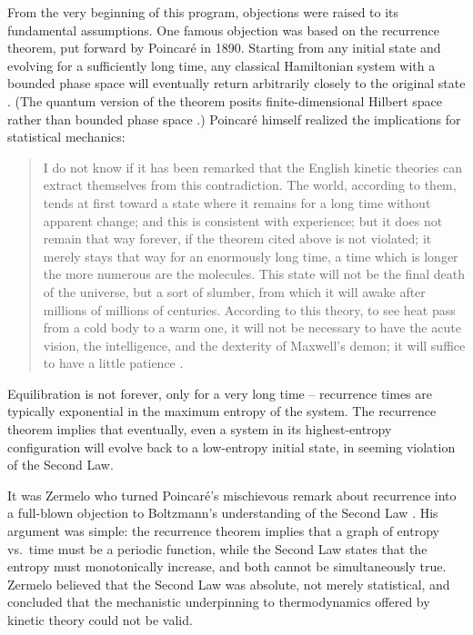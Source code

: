 \documentclass[12pt,letterpaper]{article}
\begin{document}
From the very beginning of this program, objections were raised to its fundamental assumptions.
One famous objection was based on the recurrence theorem, put forward by Poincar\'e in 1890.
Starting from any initial state and evolving for a sufficiently long time, any classical Hamiltonian system with a bounded phase space will eventually return arbitrarily closely to the original state \cite{prt}.
(The quantum version of the theorem posits finite-dimensional Hilbert space rather than bounded phase space \cite{qrt1,qrt2,qrt3,Dyson:2002pf}.)
Poincar\'e himself realized the implications for statistical mechanics:
\begin{quote}I do not know if it has been remarked that the English kinetic theories can extract themselves from this contradiction.  The world, according to them, tends at first toward a state where it remains for a long time without apparent change; and this is consistent with experience; but it does not remain that way forever, if the theorem cited above is not violated; it merely stays that way for an enormously long time, a time which is longer the more numerous are the molecules.  This state will not be the final death of the universe, but a sort of slumber, from which it will awake after millions of millions of centuries.  According to this theory, to see heat pass from a cold body to a warm one, it will not be necessary to have the acute vision, the intelligence, and the dexterity of Maxwell's demon; it will suffice to have a little patience \cite{prt}.
\end{quote}
Equilibration is not forever, only for a very long time -- recurrence times are typically exponential in the maximum entropy of the system.
The recurrence theorem implies that eventually, even a system in its highest-entropy configuration will evolve back to a low-entropy initial state, in seeming violation of the Second Law.

It was Zermelo who turned Poincar\'e's mischievous remark about recurrence into a full-blown objection to Boltzmann's understanding of the Second Law \cite{zermelo1,zermelo2}.  His argument was simple:
the recurrence theorem implies that a graph of entropy vs.\ time must be a periodic function,
while the Second Law states that the entropy must monotonically increase, and both cannot
be simultaneously true.  Zermelo believed that the Second Law was absolute, not merely
statistical, and concluded that the mechanistic underpinning to thermodynamics offered
by kinetic theory could not be valid.
\end{document}
